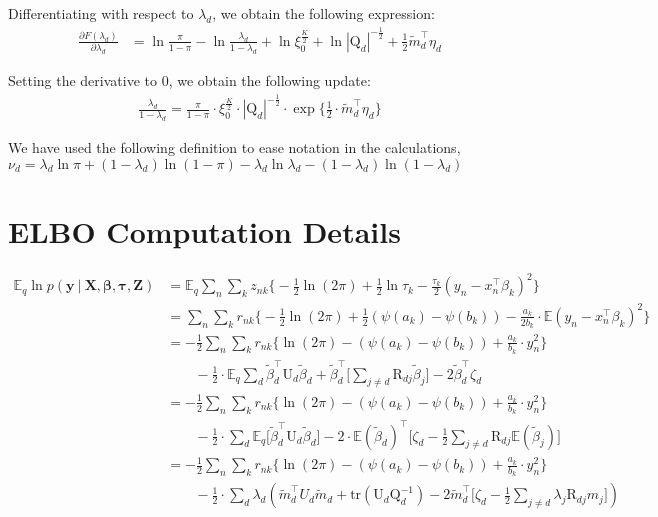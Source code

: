 \documentclass[twoside,11pt]{article}
\newcommand\given[1][]{\:#1\vert\:}
\newcommand{\transpose}[1]{#1^{\intercal}}
\newcommand{\nsum}{\sum\limits_{n}}
\newcommand{\ksum}{\sum\limits_{k}}
\newcommand{\boldbeta}{\boldsymbol\beta}
\newcommand{\boldtau}{\boldsymbol\tau}
\newcommand{\E}{\mathbb{E}}
\newcommand{\betad}{\tilde{\beta}_d}
\newcommand{\qmat}{\mathrm{Q}}
\newcommand{\trace}[1]{\mathrm{tr} \left( #1 \right)}
\begin{document}
Differentiating with respect to $\lambda_d$, we obtain the following expression:
\begin{align*}
	\frac{\partial F(\lambda_d)}{\partial \lambda_d} &= \ln \frac{\pi}{1-\pi} - \ln \frac{\lambda_d}{1-\lambda_d} + \ln \xi_0^{\frac{K}{2}} + \ln |\qmat_d|^{- \frac{1}{2}} + \frac{1}{2} \transpose{\tilde{m}_d} \eta_d
\end{align*}

Setting the derivative to 0, we obtain the following update:
\begin{align*}
	\frac{\lambda_d}{1- \lambda_d} = \frac{\pi}{1-\pi} \cdot \xi_0^{\frac{K}{2}} \cdot |\qmat_d|^{-\frac{1}{2}} \cdot \exp \Big\{ \frac{1}{2} \cdot \transpose{\tilde{m}_d} \eta_d\Big\}
\end{align*}

We have used the following definition to ease notation in the calculations, $\nu_d = \lambda_d \ln \pi + (1 - \lambda_d) \ln(1-\pi) - \lambda_d \ln \lambda_d - (1 - \lambda_d) \ln (1 - \lambda_d)$

\newpage

\section{ELBO Computation Details}


\begin{align*}
	\E_q \ln p\left( \mathbf{y} \given \mathbf{X}, \boldbeta, \boldtau, \mathbf{Z} \right) &= 
	\E_q \nsum \ksum z_{nk} \Big\{ - \frac{1}{2} \ln(2\pi) + \frac{1}{2} \ln \tau_k - \frac{\tau_k}{2}(y_n - \transpose{x_n} \beta_k)^2\Big\} \\
	&= \nsum \ksum r_{nk} \Big\{ - \frac{1}{2} \ln(2\pi) + \frac{1}{2} (\psi(a_k) - \psi(b_k)) - \frac{a_k}{2b_k} \cdot \E(y_n - \transpose{x_n} \beta_k)^2\Big\} \\
	&= - \frac{1}{2} \nsum \ksum r_{nk} \Big\{  \ln(2\pi) - (\psi(a_k) - \psi(b_k)) + \frac{a_k}{b_k} \cdot y_n^2 \Big\} \\ & \qquad -\frac{1}{2} \cdot \E_q \sum_d \transpose{\betad} \mathrm{U}_d \betad + \transpose{\betad} \Bigg[\sum_{j \neq d} \mathrm{R}_{dj} \tilde{\beta}_j \Bigg] - 2 \transpose{\betad} \zeta_d \\
	&= - \frac{1}{2} \nsum \ksum r_{nk} \Big\{  \ln(2\pi) - (\psi(a_k) - \psi(b_k)) + \frac{a_k}{b_k} \cdot y_n^2 \Big\} \\ & \qquad -\frac{1}{2} \cdot \sum_d \E_q \Big[ \transpose{\betad} \mathrm{U}_d \betad \Big] - 2 \cdot \transpose{\E\left(\betad\right)} \Bigg[ \zeta_d - \frac{1}{2} \sum_{j \neq d} \mathrm{R}_{dj} \E\left(\tilde{\beta}_j\right) \Bigg] \\
	&= - \frac{1}{2} \nsum \ksum r_{nk} \Big\{  \ln(2\pi) - (\psi(a_k) - \psi(b_k)) + \frac{a_k}{b_k} \cdot y_n^2 \Big\} \\ & \qquad - \frac{1}{2} \cdot \sum_d \lambda_d \left( \transpose{\tilde{m}_d} U_d \tilde{m}_d + \trace{\mathrm{U}_d \mathrm{Q}_d^{-1}} - 2\transpose{\tilde{m}_d} \Bigg[ \zeta_d - \frac{1}{2} \sum_{j\neq d} \lambda_j \mathrm{R}_{dj} m_j\Bigg] \right)
\end{align*}
\end{document}
